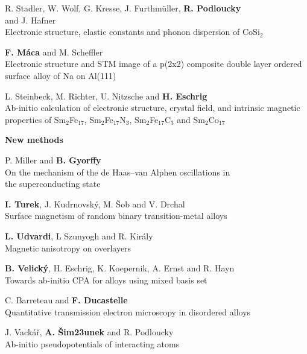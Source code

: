 {R. Stadler, W. Wolf, G. Kresse, J. Furthm\"uller,
                 {\bf R. Podloucky}\\
                  and J. Hafner \\
                 Electronic structure, elastic constants and phonon
                  dispersion
                   of CoSi$_2$

{\bf F. M\'aca} and M. Scheffler \\
                Electronic structure and STM image of a p(2x2)
               composite double
                layer ordered surface alloy of Na on Al(111)

L. Steinbeck, M. Richter, U. Nitzsche and {\bf H.
Eschrig}\\
                Ab-initio calculation of electronic structure, crystal
               field, and
                intrinsic magnetic properties of Sm$_2$Fe$_{17}$,
               Sm$_2$Fe$_{17}$N$_3$,
                Sm$_2$Fe$_{17}$C$_3$ and Sm$_2$Co$_{17}$


\vskip4mm
{\Large{\bf New methods }}

\vskip1mm

P. Miller and {\bf B. Gyorffy}\\
                On the mechanism of the de Haas--van Alphen
               oscillations in \\
                the superconducting state

 {\bf I. Turek}, J. Kudrnovsk\'y,
                      M. \v Sob and V. Drchal  \\
                Surface magnetism of random binary
                    transition-metal alloys

                {\bf L. Udvardi}, L Szunyogh and R. Kir\'aly \\
                Magnetic anisotropy on overlayers


{\bf B. Velick\'y}, H. Eschrig, K. Koepernik,
                       A. Ernst and R. Hayn\\
                     Towards ab-initio CPA for alloys using mixed basis
                    set

                C. Barreteau and {\bf F. Ducastelle} \\
                Quantitative transmission electron microscopy in
                 disordered alloys

J. Vack\'a\v r, {\bf A. \v Sim\accent23unek} and R.
Podloucky\\
                     Ab-initio pseudopotentials of interacting atoms


}
